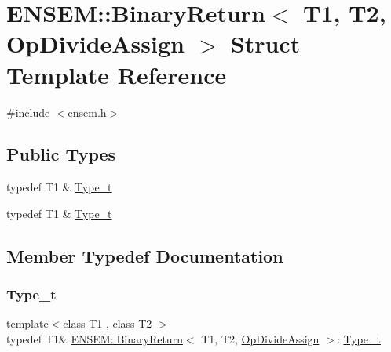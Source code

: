 \hypertarget{structENSEM_1_1BinaryReturn_3_01T1_00_01T2_00_01OpDivideAssign_01_4}{}\section{E\+N\+S\+EM\+:\+:Binary\+Return$<$ T1, T2, Op\+Divide\+Assign $>$ Struct Template Reference}
\label{structENSEM_1_1BinaryReturn_3_01T1_00_01T2_00_01OpDivideAssign_01_4}


{\ttfamily \#include $<$ensem.\+h$>$}

\subsection*{Public Types}
\begin{DoxyCompactItemize}
\item 
typedef T1 \& \mbox{\hyperlink{structENSEM_1_1BinaryReturn_3_01T1_00_01T2_00_01OpDivideAssign_01_4_a02fea7e2c56cca02f54cf841a28052d3}{Type\+\_\+t}}
\item 
typedef T1 \& \mbox{\hyperlink{structENSEM_1_1BinaryReturn_3_01T1_00_01T2_00_01OpDivideAssign_01_4_a02fea7e2c56cca02f54cf841a28052d3}{Type\+\_\+t}}
\end{DoxyCompactItemize}


\subsection{Member Typedef Documentation}
\mbox{\label{structENSEM_1_1BinaryReturn_3_01T1_00_01T2_00_01OpDivideAssign_01_4_a02fea7e2c56cca02f54cf841a28052d3}} 
\subsubsection{\texorpdfstring{Type\_t}{Type\_t}\hspace{0.1cm}{\footnotesize\ttfamily [1/2]}}
{\footnotesize\ttfamily template$<$class T1 , class T2 $>$ \\
typedef T1\& \mbox{\hyperlink{structENSEM_1_1BinaryReturn}{E\+N\+S\+E\+M\+::\+Binary\+Return}}$<$ T1, T2, \mbox{\hyperlink{structENSEM_1_1OpDivideAssign}{Op\+Divide\+Assign}} $>$\+::\mbox{\hyperlink{structENSEM_1_1BinaryReturn_3_01T1_00_01T2_00_01OpDivideAssign_01_4_a02fea7e2c56cca02f54cf841a28052d3}{Type\+\_\+t}}}

